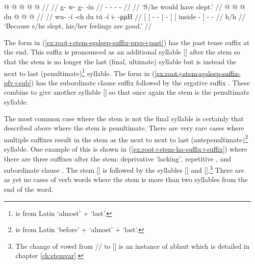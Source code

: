 \pex\label{exx:root+stem-sgsleep-suffix}%
\a\label{ex:root+stem-sgsleep-suffix-prsp+past}%
%
\begingl
	\gla	{} @ {} @ {} @ {} @ {} @ {} //
	\glp	\llap{[}\rlap{\ipa{kʷùː.qà.ˈ\gm{tʰàː}.jín}]} {} {} {} {} {} //
	\glb	g- w- g̱-   -ín //
	\glc	{}- - -   - //
	\gld	{} {} {} {} {} {} //
	\glft	‘S/he would have slept.’
		//
\endgl
\a\label{ex:root+stem-sgsleep-suffix-pfv+sub}%
%
\begingl
	\gla	{} {}  @ {} @ {} @ {} {} {} {}
		{} du  @ {} {}  @ {} @ {} //
	\glp	{} {} \llap{[} {} {} {} {} {} {}
		{}   {} {} \rlap{\ipa{jà.ˈkʼéː}]} {} {} //
	\glb	{} {} wu-   -í {} -ch {}
		{} du tú -í {} i-  -μμH //
	\glc	{}[ {}[ -   - {}] - {}]
		{}[  inside - {}] -  - //
	\gld	{} {}  {} {} {} {} {} {}
		{} h/h  {} {}  {} {} //
	\glft	‘Because s/he slept, his/her feelings are good.’
		//
\endgl
\xe

The form in (\ref{ex:root+stem-sgsleep-suffix-prsp+past}) has the past tense suffix  at the end. This suffix is pronounced as an additional syllable [] after the stem so that the stem is no longer the last (final, ultimate) syllable but is instead the next to last (penultimate)\footnote{ is from Latin  ‘almost’ +  ‘last’.} syllable. The form in (\ref{ex:root+stem-sgsleep-suffix-pfv+sub}) has the subordinate clause suffix  followed by the ergative suffix . These combine to give another syllable [] so that once again the stem is the penultimate syllable.

The most common case where the stem is not the final syllable is certainly that described above where the stem is penultimate. There are very rare cases where multiple suffixes result in the stem as the next to next to last (antepenultimate)\footnote{ is from Latin  ‘before’ +  ‘almost’ +  ‘last’.} syllable. One example of this is shown in (\ref{ex:root+stem-ha-suffix+suffix}) where there are three suffixes after the stem: deprivative  ‘lacking’, repetitive , and subordinate clause . The stem [] is followed by the syllables [] and [].\footnote{The change of vowel from // to [] is an instance of ablaut which is detailed in chapter \ref{ch:stemvar}.} There are as yet no cases of verb words where the stem is more than two syllables from the end of the word.

